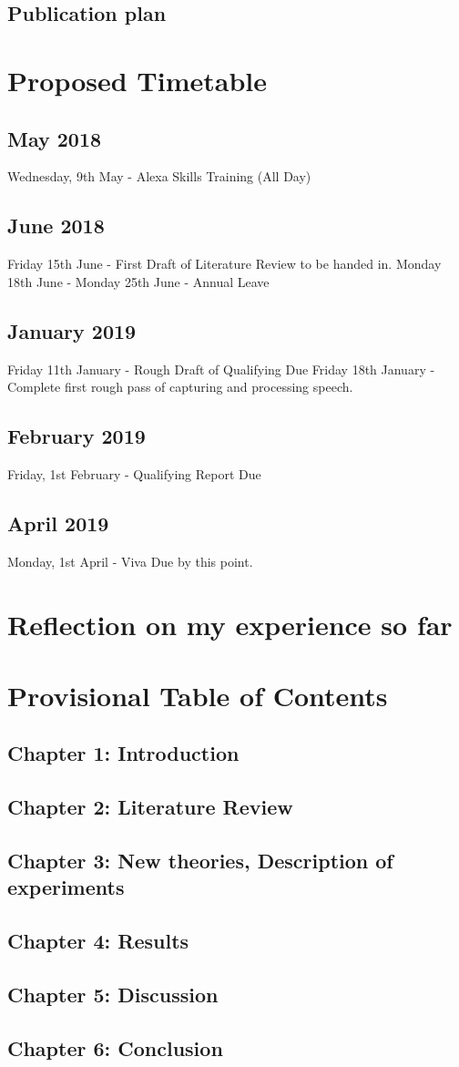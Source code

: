 \documentclass{article}
\begin{document}
	\subsection{Publication plan}
	
	\section{Proposed Timetable}
	
	\subsection{May 2018}
	Wednesday, 9th May - Alexa Skills Training (All Day)
	\subsection{June 2018}
	Friday 15th June - First Draft of Literature Review to be handed in.
	\newline
	Monday 18th June - Monday 25th June - Annual Leave
	\subsection{January 2019}
	Friday 11th January - Rough Draft of Qualifying Due
	Friday 18th January - Complete first rough pass of capturing and processing speech.
	
	\subsection{February 2019}
	Friday, 1st February - Qualifying Report Due
	\subsection{April 2019}
	Monday, 1st April - Viva Due by this point.
	
	\section{Reflection on my experience so far}
	
	\section{Provisional Table of Contents}
	\subsection{Chapter 1: Introduction}
	\subsection{Chapter 2: Literature Review}
	\subsection{Chapter 3: New theories, Description of experiments}
	\subsection{Chapter 4: Results}
	\subsection{Chapter 5: Discussion}
	\subsection{Chapter 6: Conclusion}
	
	
	
\end{document}
